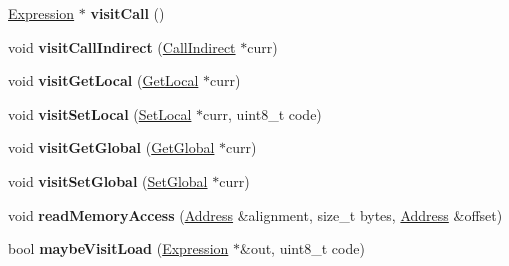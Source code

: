 \begin{DoxyCompactItemize}
\item 
\mbox{\label{classwasm_1_1_wasm_binary_builder_a5f4fc881c3872f9bcbdf28afdb72fb69}} 
\mbox{\hyperlink{classwasm_1_1_expression}{Expression}} $\ast$ {\bfseries visit\+Call} ()
\item 
\mbox{\label{classwasm_1_1_wasm_binary_builder_ab3aba9c8e3c3cc11849114dfbe509150}} 
void {\bfseries visit\+Call\+Indirect} (\mbox{\hyperlink{classwasm_1_1_call_indirect}{Call\+Indirect}} $\ast$curr)
\item 
\mbox{\label{classwasm_1_1_wasm_binary_builder_a55a0468a6a082695482808b68d1b4ba6}} 
void {\bfseries visit\+Get\+Local} (\mbox{\hyperlink{classwasm_1_1_get_local}{Get\+Local}} $\ast$curr)
\item 
\mbox{\label{classwasm_1_1_wasm_binary_builder_a72d3a16b663e14a8ccfbb6c396b262a4}} 
void {\bfseries visit\+Set\+Local} (\mbox{\hyperlink{classwasm_1_1_set_local}{Set\+Local}} $\ast$curr, uint8\+\_\+t code)
\item 
\mbox{\label{classwasm_1_1_wasm_binary_builder_a8f9d5df90623c0e8afbfc68ffc5b9d5d}} 
void {\bfseries visit\+Get\+Global} (\mbox{\hyperlink{classwasm_1_1_get_global}{Get\+Global}} $\ast$curr)
\item 
\mbox{\label{classwasm_1_1_wasm_binary_builder_ab5980037647e7701547fb2e2b68bb01f}} 
void {\bfseries visit\+Set\+Global} (\mbox{\hyperlink{classwasm_1_1_set_global}{Set\+Global}} $\ast$curr)
\item 
\mbox{\label{classwasm_1_1_wasm_binary_builder_ac3350274d78e8eea295396929683badd}} 
void {\bfseries read\+Memory\+Access} (\mbox{\hyperlink{structwasm_1_1_address}{Address}} \&alignment, size\+\_\+t bytes, \mbox{\hyperlink{structwasm_1_1_address}{Address}} \&offset)
\item 
\mbox{\label{classwasm_1_1_wasm_binary_builder_a7400e82bc84e9ba555a5fa5b71010a9f}} 
bool {\bfseries maybe\+Visit\+Load} (\mbox{\hyperlink{classwasm_1_1_expression}{Expression}} $\ast$\&out, uint8\+\_\+t code)

\end{DoxyCompactItemize}
